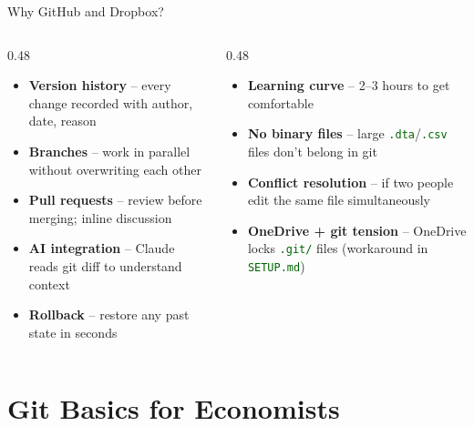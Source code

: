 \documentclass[aspectratio=169,11pt,dvipsnames]{beamer}
\newcommand{\file}[1]{\textcolor{darkgreen}{\nolinkurl{#1}}}
\begin{document}
\begin{frame}{Why GitHub and Dropbox?}
  \begin{columns}[T]
    \begin{column}{0.48\textwidth}
      \begin{greenbox}[title=\faCheckCircle\ What you gain with GitHub]
        \begin{itemize}\setlength\itemsep{3pt}
        \scriptsize
          \item \textbf{Version history} -- every change recorded with author, date, reason
          \item \textbf{Branches} -- work in parallel without overwriting each other
          \item \textbf{Pull requests} -- review before merging; inline discussion
          \item \textbf{AI integration} -- Claude reads git diff to understand context
          \item \textbf{Rollback} -- restore any past state in seconds
        \end{itemize}
      \end{greenbox}
    \end{column}
    \begin{column}{0.48\textwidth}
      \begin{alertbox}[title=\faExclamationTriangle\ Real trade-offs]
        \begin{itemize}\setlength\itemsep{3pt}
        \scriptsize
          \item \textbf{Learning curve} -- 2--3 hours to get comfortable
          \item \textbf{No binary files} -- large \file{.dta}/\file{.csv} files don't belong in git
          \item \textbf{Conflict resolution} -- if two people edit the same file simultaneously
          \item \textbf{OneDrive + git tension} -- OneDrive locks \file{.git/} files (workaround in \file{SETUP.md})
        \end{itemize}
      \end{alertbox}
    \end{column}
  \end{columns}

\end{frame}

\section{Git Basics for Economists}
\end{document}
